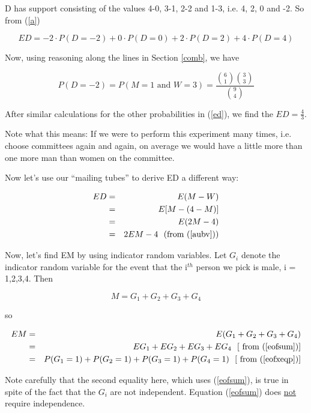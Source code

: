 D has support consisting of the values 4-0, 3-1, 2-2 and 1-3, i.e. 4, 2,
0 and -2.  So from (\ref{a})

\begin{equation}
\label{ed}
ED = 
-2 \cdot P(D = -2) +
0 \cdot P(D = 0) +
2 \cdot P(D = 2) +
4 \cdot P(D = 4) 
\end{equation}

Now, using reasoning along the lines in Section \ref{comb}, we have

\begin{equation}
P(D = -2) = P(M = 1 \textrm{ and } W = 3) =
\frac
{\binom{6}{1} \binom{3}{3}}
{\binom{9}{4}} 
\end{equation}

After similar calculations for the other probabilities in (\ref{ed}),
we find the $ED = \frac{4}{3}$.  

Note what this means: If we were to perform this experiment many times,
i.e. choose committees again and again, on average we would have a
little more than one more man than women on the committee.

Now let's use our ``mailing tubes'' to derive ED a different way:

\begin{eqnarray}
ED &=& E(M - W) \\ 
&=& E[ M - (4-M)] \\
&=& E(2 M - 4) \\
&=& 2 EM - 4 ~~ (\textrm{from } (\ref{aubv})) 
\end{eqnarray}

Now, let's find EM by using indicator random variables.  Let $G_i$
denote the indicator random variable for the event that the i$^{th}$
person we pick is male, i = 1,2,3,4.  Then

\begin{equation}
\label{massum}
M = G_1 + G_2 + G_3 + G_4
\end{equation}

so 

\begin{eqnarray}
EM &=& E(G_1 + G_2 + G_3 + G_4) \\ 
&=& EG_1 + EG_2 + EG_3 + EG_4 ~~  [\textrm{ from } (\ref{eofsum})] \\
&=& P(G_1 = 1) + P(G_2 = 1) + P(G_3 = 1) + P(G_4 = 1) ~~ [\textrm{ from } (\ref{eofxeqp})]
\label{4g}
\end{eqnarray}

Note carefully that the second equality here, which uses (\ref{eofsum}),
is true in spite of the fact that the $G_i$ are not independent.
Equation (\ref{eofsum}) does \underline{not} require independence.

